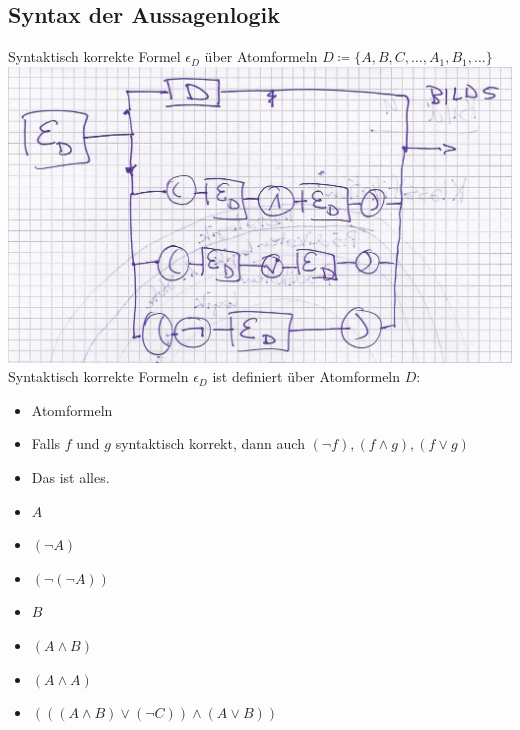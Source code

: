 \subsection{Syntax der Aussagenlogik}
\begin{def*}[note = korrekte Formel , index = Formel!korrekte]
	Syntaktisch korrekte Formel $\epsilon_D$ über Atomformeln $D \coloneqq \{ A , B , C , \dotsc , A_1 , B_1 , \dotsc \}$ \\
	\includegraphics[width=\textwidth]{Bild7} \\
	Syntaktisch korrekte Formeln $\epsilon_D$ ist definiert über Atomformeln $D$:
	\begin{itemize}
		\item Atomformeln
		\item Falls $f$ und $g$ syntaktisch korrekt, dann auch $( \neg f ) , ( f \wedge g ) , ( f \vee g )$
		\item Das ist alles.
	\end{itemize}
\end{def*}
\begin{bsp*}
	\begin{itemize}
		\item $A$
		\item $( \neg A )$
		\item $( \neg ( \neg A ) )$
		\item $B$
		\item $( A \wedge B )$
		\item $( A \wedge A )$
		\item $( ( ( A \wedge B ) \vee ( \neg C ) ) \wedge ( A \vee B ) )$
	\end{itemize}
\end{bsp*}
